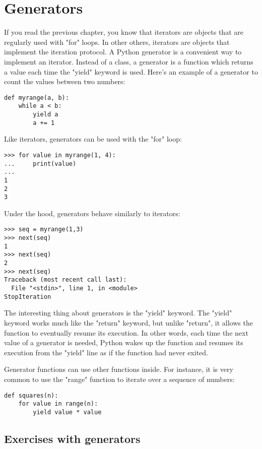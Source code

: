 \chapter{Generators}\label{generators}

If you read the previous chapter, you know that iterators are objects that are regularly used with "for" loops. In other others, iterators are objects that implement the iteration protocol. A Python generator is a convenient way to implement an iterator. Instead of a class, a generator is a function which returns a value each time the "yield" keyword is used. Here's an example of a generator to count the values between two numbers:

\begin{lstlisting}
def myrange(a, b):
    while a < b:
        yield a
        a += 1
\end{lstlisting}

Like iterators, generators can be used with the "for" loop:

\begin{lstlisting}
>>> for value in myrange(1, 4):
...     print(value)
... 
1
2
3
\end{lstlisting}

Under the hood, generators behave similarly to iterators:

\begin{lstlisting}
>>> seq = myrange(1,3)
>>> next(seq)
1
>>> next(seq)
2
>>> next(seq)
Traceback (most recent call last):
  File "<stdin>", line 1, in <module>
StopIteration
\end{lstlisting}

The interesting thing about generators is the "yield" keyword. The "yield" keyword works much like the "return" keyword, but unlike "return", it allows the function to eventually resume its execution. In other words, each time the next value of a generator is needed, Python wakes up the function and resumes its execution from the "yield" line as if the function had never exited.

Generator functions can use other functions inside. For instance, it is very common to use the "range" function to iterate over a sequence of numbers:

\begin{lstlisting}
def squares(n):
    for value in range(n):
        yield value * value
\end{lstlisting}

\section{Exercises with generators}

